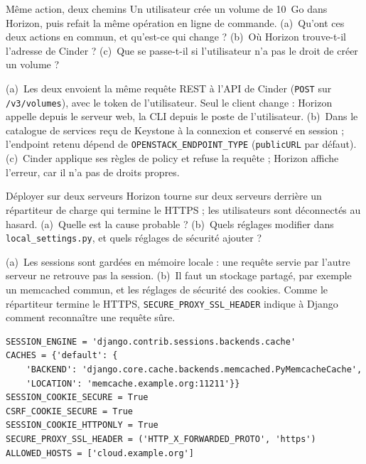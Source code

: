 \begin{exercice}{Même action, deux chemins}\label{ex:ho-chemins}
Un utilisateur crée un volume de 10~Go dans Horizon, puis refait la même opération en ligne de commande. (a)~Qu'ont ces
deux actions en commun, et qu'est-ce qui change ? (b)~Où Horizon trouve-t-il l'adresse de Cinder ? (c)~Que se passe-t-il si
l'utilisateur n'a pas le droit de créer un volume ?
\end{exercice}
\begin{correction}
(a)~Les deux envoient la même requête REST à l'API de Cinder (\texttt{POST} sur \texttt{/v3/volumes}), avec le token de
l'utilisateur. Seul le client change : Horizon appelle depuis le serveur web, la CLI depuis le poste de l'utilisateur.
(b)~Dans le catalogue de services reçu de Keystone à la connexion et conservé en session ; l'endpoint retenu dépend de
\texttt{OPENSTACK\_\allowbreak ENDPOINT\_\allowbreak TYPE} (\texttt{publicURL} par défaut). (c)~Cinder applique ses règles de \gls{policy} et refuse la
requête ; Horizon affiche l'erreur, car il n'a pas de droits propres.
\end{correction}

\begin{exercice}{Déployer sur deux serveurs}\label{ex:ho-deploiement}
Horizon tourne sur deux serveurs derrière un répartiteur de charge qui termine le HTTPS ; les utilisateurs sont
déconnectés au hasard. (a)~Quelle est la cause probable ? (b)~Quels réglages modifier dans \texttt{local\_\allowbreak settings.py}, et quels
réglages de sécurité ajouter ?
\end{exercice}
\begin{correction}
(a)~Les sessions sont gardées en mémoire locale : une requête servie par l'autre serveur ne retrouve pas la session.
(b)~Il faut un stockage partagé, par exemple un memcached commun, et les réglages de sécurité des cookies. Comme le
répartiteur termine le HTTPS, \texttt{SECURE\_\allowbreak PROXY\_\allowbreak SSL\_\allowbreak HEADER} indique à Django comment reconnaître une requête sûre.
\begin{lstlisting}
SESSION_ENGINE = 'django.contrib.sessions.backends.cache'
CACHES = {'default': {
    'BACKEND': 'django.core.cache.backends.memcached.PyMemcacheCache',
    'LOCATION': 'memcache.example.org:11211'}}
SESSION_COOKIE_SECURE = True
CSRF_COOKIE_SECURE = True
SESSION_COOKIE_HTTPONLY = True
SECURE_PROXY_SSL_HEADER = ('HTTP_X_FORWARDED_PROTO', 'https')
ALLOWED_HOSTS = ['cloud.example.org']
\end{lstlisting}
\end{correction}

